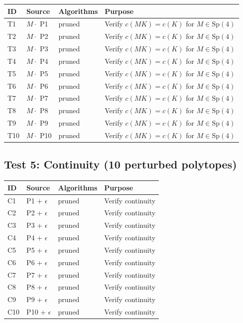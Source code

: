 \documentclass{article}
\begin{document}
\begin{tabular}{lllp{5cm}}
\toprule
ID & Source & Algorithms & Purpose \\
\midrule
T1 & $M \cdot$ P1 & pruned & Verify $c(MK) = c(K)$ for $M \in \mathrm{Sp}(4)$ \\
T2 & $M \cdot$ P2 & pruned & Verify $c(MK) = c(K)$ for $M \in \mathrm{Sp}(4)$ \\
T3 & $M \cdot$ P3 & pruned & Verify $c(MK) = c(K)$ for $M \in \mathrm{Sp}(4)$ \\
T4 & $M \cdot$ P4 & pruned & Verify $c(MK) = c(K)$ for $M \in \mathrm{Sp}(4)$ \\
T5 & $M \cdot$ P5 & pruned & Verify $c(MK) = c(K)$ for $M \in \mathrm{Sp}(4)$ \\
T6 & $M \cdot$ P6 & pruned & Verify $c(MK) = c(K)$ for $M \in \mathrm{Sp}(4)$ \\
T7 & $M \cdot$ P7 & pruned & Verify $c(MK) = c(K)$ for $M \in \mathrm{Sp}(4)$ \\
T8 & $M \cdot$ P8 & pruned & Verify $c(MK) = c(K)$ for $M \in \mathrm{Sp}(4)$ \\
T9 & $M \cdot$ P9 & pruned & Verify $c(MK) = c(K)$ for $M \in \mathrm{Sp}(4)$ \\
T10 & $M \cdot$ P10 & pruned & Verify $c(MK) = c(K)$ for $M \in \mathrm{Sp}(4)$ \\
\bottomrule
\end{tabular}

\subsection*{Test 5: Continuity (10 perturbed polytopes)}

\begin{tabular}{lllp{5cm}}
\toprule
ID & Source & Algorithms & Purpose \\
\midrule
C1 & P1 + $\epsilon$ & pruned & Verify continuity \\
C2 & P2 + $\epsilon$ & pruned & Verify continuity \\
C3 & P3 + $\epsilon$ & pruned & Verify continuity \\
C4 & P4 + $\epsilon$ & pruned & Verify continuity \\
C5 & P5 + $\epsilon$ & pruned & Verify continuity \\
C6 & P6 + $\epsilon$ & pruned & Verify continuity \\
C7 & P7 + $\epsilon$ & pruned & Verify continuity \\
C8 & P8 + $\epsilon$ & pruned & Verify continuity \\
C9 & P9 + $\epsilon$ & pruned & Verify continuity \\
C10 & P10 + $\epsilon$ & pruned & Verify continuity \\
\bottomrule
\end{tabular}
\end{document}
